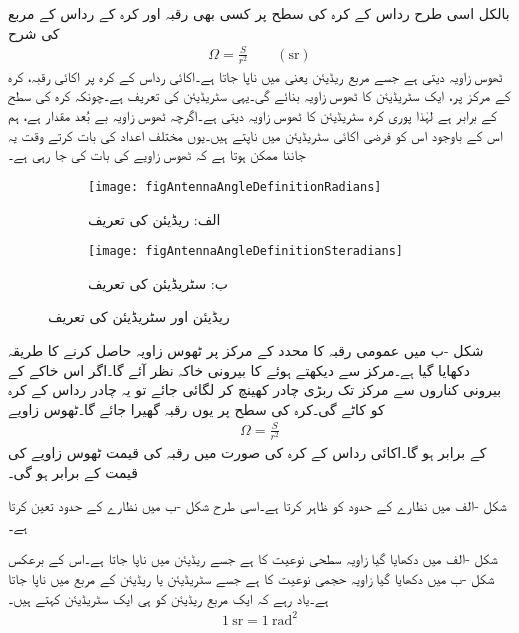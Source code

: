 بالکل اسی طرح  رداس  کے کرہ کی سطح پر کسی بھی رقبہ  اور کرہ کے رداس کے مربع  کی شرح
\begin{align}\label{مساوات_اینٹینا_ٹھوس_زاویہ_تعریف}
\Omega=\frac{S}{r^2} \quad \quad (\si{\steradian})
\end{align}
ٹھوس زاویہ  دیتی ہے جسے مربع ریڈیئن یعنی   میں ناپا جاتا ہے۔اکائی رداس کے کرہ پر اکائی رقبہ، کرہ کے مرکز پر، ایک سٹریڈیئن  کا ٹھوس زاویہ بنائے گی۔یہی سٹریڈیئن کی تعریف ہے۔چونکہ کرہ کی سطح  کے برابر ہے لہٰذا پوری کرہ  سٹریڈیئن کا ٹھوس زاویہ دیتی ہے۔اگرچہ ٹھوس زاویہ بے بُعد مقدار ہے، ہم اس کے باوجود اس کو فرضی اکائی سٹریڈیئن میں ناپتے ہیں۔یوں مختلف اعداد کی بات کرتے وقت یہ جاننا ممکن ہوتا ہے کہ ٹھوس زاویے کی بات کی جا رہی ہے۔ 
\begin{figure}
\centering
\begin{subfigure}{0.4\textwidth}
\centering
\texttt{[image: figAntennaAngleDefinitionRadians]}
\caption*{الف: ریڈیئن کی تعریف}
\end{subfigure}%
%
\begin{subfigure}{0.4\textwidth}
\centering
\texttt{[image: figAntennaAngleDefinitionSteradians]}
\caption*{ب: سٹریڈیئن کی تعریف}
\end{subfigure}%
\caption{ریڈیئن اور سٹریڈیئن کی تعریف}
\label{شکل_اینٹینا_ریڈیئن_تعریف}
\end{figure}

شکل -ب میں عمومی رقبہ  کا محدد کے مرکز پر ٹھوس زاویہ حاصل کرنے کا طریقہ دکھایا گیا ہے۔مرکز سے دیکھتے ہوئے  کا بیرونی خاکہ نظر آئے گا۔اگر اس خاکے کے بیرونی کناروں سے  مرکز تک ربڑی چادر کھینچ کر لگائی جائے تو یہ چادر رداس  کے کرہ کو کاٹے گی۔کرہ کی سطح پر یوں رقبہ  گھیرا جائے گا۔ٹھوس زاویے
\begin{align}
\Omega=\frac{S}{r^2}
\end{align}
کے برابر ہو گا۔اکائی رداس کے کرہ کی صورت میں رقبہ  کی قیمت ٹھوس زاویے کی قیمت کے برابر ہو گی۔

شکل -الف میں   نظارے کے حدود کو ظاہر کرتا ہے۔اسی طرح شکل -ب میں  نظارے  کے حدود تعین کرتا ہے۔

شکل -الف  میں دکھایا گیا زاویہ سطحی نوعیت کا ہے جسے ریڈیئن میں ناپا جاتا ہے۔اس کے برعکس شکل -ب  میں دکھایا گیا زاویہ حجمی نوعیت کا ہے جسے سٹریڈیئن یا ریڈیئن کے مربع میں ناپا جاتا ہے۔یاد رہے کہ ایک مربع ریڈیئن کو ہی ایک سٹریڈیئن کہتے ہیں۔
\begin{align}
\SI{1}{\steradian}=\SI{1}{\radian \squared}
\end{align} 

